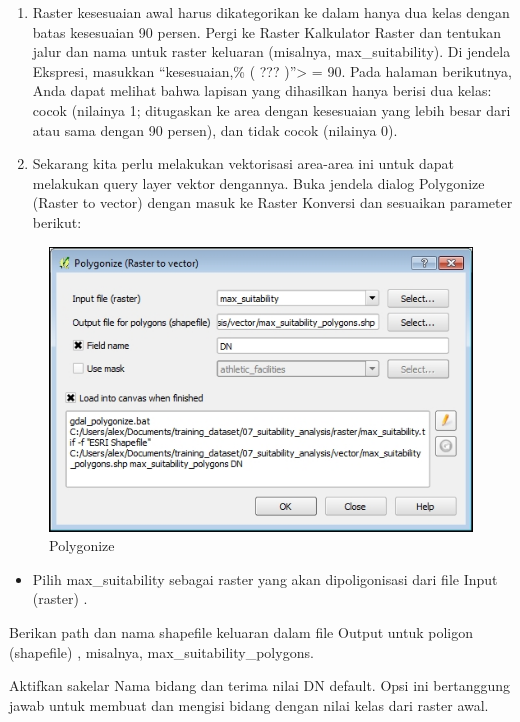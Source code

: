 \documentclass[]{book}
\providecommand{\tightlist}{%
  \setlength{\itemsep}{0pt}\setlength{\parskip}{0pt}}
\begin{document}
\begin{enumerate}
\def\labelenumi{\arabic{enumi}.}
\item
  Raster kesesuaian awal harus dikategorikan ke dalam hanya dua kelas dengan batas kesesuaian 90 persen. Pergi ke Raster \textbar{} Kalkulator Raster dan tentukan jalur dan nama untuk raster keluaran (misalnya, max\_suitability). Di jendela Ekspresi, masukkan ``kesesuaian,\% ( ??? )''\textgreater{} = 90. Pada halaman berikutnya, Anda dapat melihat bahwa lapisan yang dihasilkan hanya berisi dua kelas: cocok (nilainya 1; ditugaskan ke area dengan kesesuaian yang lebih besar dari atau sama dengan 90 persen), dan tidak cocok (nilainya 0).
\item
  Sekarang kita perlu melakukan vektorisasi area-area ini untuk dapat melakukan query layer vektor dengannya. Buka jendela dialog Polygonize (Raster to vector) dengan masuk ke Raster \textbar{} Konversi dan sesuaikan parameter berikut:
\end{enumerate}

\begin{figure}

{\centering \includegraphics[width=0.7\linewidth]{images/04/fig43} 

}

\caption{Polygonize}\label{fig:fig1443}
\end{figure}

\begin{itemize}
\tightlist
\item
  Pilih max\_suitability sebagai raster yang akan dipoligonisasi dari file Input (raster) .
\end{itemize}

Berikan path dan nama shapefile keluaran dalam file Output untuk poligon (shapefile) , misalnya, max\_suitability\_polygons.

Aktifkan sakelar Nama bidang dan terima nilai DN default. Opsi ini bertanggung jawab untuk membuat dan mengisi bidang dengan nilai kelas dari raster awal.
\end{document}
